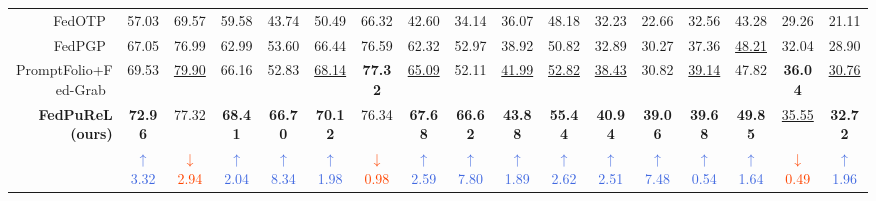\documentclass[10pt,twocolumn,letterpaper]{article}
\newcommand{\blueup}[1]{\textcolor{RoyalBlue}{$\uparrow$ #1}}
\newcommand{\reddown}[1]{\textcolor{OrangeRed}{$\downarrow$ #1}}
\begin{document}
\begin{table}[t]
\begin{tabular}{r||cccc|cccc|cccc|cccc}
 
\cellcolor{gray!10}FedOTP~\cite{li2024fedotp}
 & \cellcolor{gray!10}57.03 & \cellcolor{gray!10}69.57 & \cellcolor{gray!10}59.58 & \cellcolor{gray!10}43.74
 & \cellcolor{gray!10}50.49 & \cellcolor{gray!10}66.32 & \cellcolor{gray!10}42.60 & \cellcolor{gray!10}34.14
 & \cellcolor{gray!10}36.07 & \cellcolor{gray!10}48.18 & \cellcolor{gray!10}32.23 & \cellcolor{gray!10}22.66
 & \cellcolor{gray!10}32.56 & \cellcolor{gray!10}43.28 & \cellcolor{gray!10}29.26 & \cellcolor{gray!10}21.11 \\

 
FedPGP~\cite{cui2024fedpgp}
 & 67.05 & 76.99 & 62.99 & 53.60
 & 66.44 & 76.59 & 62.32 & 52.97
 & 38.92 & 50.82 & 32.89 & 30.27
 & 37.36 & \underline{48.21} & 32.04 & 28.90 \\


 
\cellcolor{gray!10}
PromptFolio+Fed-Grab~\cite{Fed-Grab}
 & \cellcolor{gray!10}69.53 & \cellcolor{gray!10}\underline{79.90} & \cellcolor{gray!10}66.16 & \cellcolor{gray!10}52.83
 & \cellcolor{gray!10}\underline{68.14} & \cellcolor{gray!10}\textbf{77.32} & \cellcolor{gray!10}\underline{65.09} & \cellcolor{gray!10}52.11
 & \cellcolor{gray!10}\underline{41.99} & \cellcolor{gray!10}\underline{52.82} & \cellcolor{gray!10}\underline{38.43} & \cellcolor{gray!10}30.82
 & \cellcolor{gray!10}\underline{39.14} & \cellcolor{gray!10}47.82 & \cellcolor{gray!10}\textbf{36.04} & \cellcolor{gray!10}\underline{30.76} \\

 
\cellcolor[HTML]{D7F6FF}\textbf{FedPuReL (ours)}
 & \cellcolor[HTML]{D7F6FF}\textbf{72.96} & \cellcolor[HTML]{D7F6FF}77.32 & \cellcolor[HTML]{D7F6FF}\textbf{68.41} & \cellcolor[HTML]{D7F6FF}\textbf{66.70}
 & \cellcolor[HTML]{D7F6FF}\textbf{70.12} & \cellcolor[HTML]{D7F6FF}76.34 & \cellcolor[HTML]{D7F6FF}\textbf{67.68} & \cellcolor[HTML]{D7F6FF}\textbf{66.62}
 & \cellcolor[HTML]{D7F6FF}\textbf{43.88} & \cellcolor[HTML]{D7F6FF}\textbf{55.44} & \cellcolor[HTML]{D7F6FF}\textbf{40.94} & \cellcolor[HTML]{D7F6FF}\textbf{39.06}
 & \cellcolor[HTML]{D7F6FF}\textbf{39.68} & \cellcolor[HTML]{D7F6FF}\textbf{49.85} & \cellcolor[HTML]{D7F6FF}\underline{35.55} & \cellcolor[HTML]{D7F6FF}\textbf{32.72} \\

\textcolor{gray!60}&
\blueup{3.32} & \reddown{2.94} & \blueup{2.04} & \blueup{8.34} &
\blueup{1.98} & \reddown{0.98} & \blueup{2.59} & \blueup{7.80} &
\blueup{1.89} & \blueup{2.62} & \blueup{2.51} & \blueup{7.48} &
\blueup{0.54} & \blueup{1.64} & \reddown{0.49} & \blueup{1.96} \\


\end{tabular}
\end{table}
\end{document}
